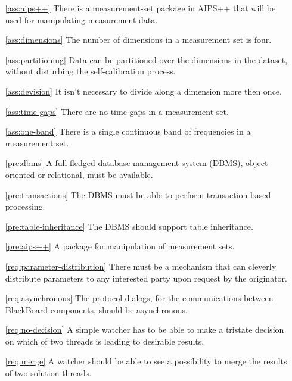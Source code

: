 \documentclass[]{lofar}
\begin{document}
\appendix

  \label{app:assumptions}\hypertarget{app:assumptions}{}

    \begin{itemize}
      \item [\ref{ass:aips++}]There is a measurement-set package in
        AIPS++ that will be used for manipulating measurement data.
      \item [\ref{ass:dimensions}]The number of dimensions in a
        measurement set is four.
      \item [\ref{ass:partitioning}]Data can be partitioned over the
        dimensions in the dataset, without disturbing the
        self-calibration process.
      \item [\ref{ass:devision}]It isn't necessary to divide along a
        dimension more then once.
      \item [\ref{ass:time-gaps}]There are no time-gaps in a
        measurement set.
      \item [\ref{ass:one-band}]There is a single continuous band of
        frequencies in a measurement set.
    \end{itemize}

  \label{app:prerequisites}\hypertarget{app:prerequisites}{}

    \begin{itemize}
      \item [\ref{pre:dbms}]A full fledged database management system
        (DBMS), object oriented or relational, must be available.
      \item [\ref{pre:transactions}]The DBMS must be able to perform
        transaction based processing.
      \item [\ref{pre:table-inheritance}]The DBMS should support table
        inheritance.
      \item [\ref{pre:aips++}]A package for manipulation of
        measurement sets.
    \end{itemize}

  \label{app:requirements-list}\hypertarget{app:requirements-list}{}%

    \begin{itemize}
      \item [\ref{req:parameter-distribution}]There must be a
        mechanism that can cleverly distribute parameters to any
        interested party upon request by the originator.
      \item [\ref{req:asynchronous}]The protocol dialogs, for the
        communications between BlackBoard components, should be
        asynchronous.
      \item [\ref{req:no-decision}]A simple watcher has to be able to
        make a tristate decision on which of two threads is leading to
        desirable results.
      \item [\ref{req:merge}]A watcher should be able to see a
        possibility to merge the results of two solution threads.
    \end{itemize}
\end{document}
